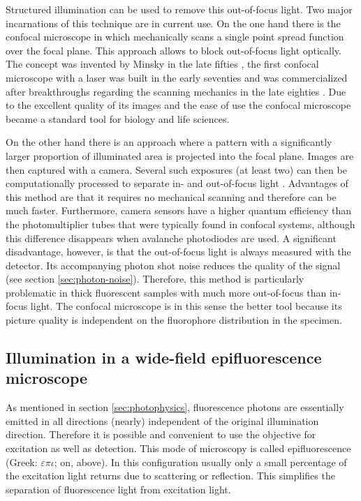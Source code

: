 Structured 
illumination can be used to remove this out-of-focus light. 
Two major incarnations of this technique are in current use.  On the one
hand there is the confocal microscope\label{sec:confocal} in which
mechanically scans a single point spread function over the focal
plane. This approach allows to block out-of-focus light optically. The
concept was invented by Minsky in the late fifties \citep{Minsky1961},
the first confocal microscope with a laser was built in the early
seventies \citep{davidovits1971scanning} and was commercialized after
breakthroughs regarding the scanning mechanics in the late eighties
\cite{Amos1987}. Due to the excellent quality of its images and the
ease of use the confocal microscope became a standard tool for biology
and life sciences.

On  the other
hand there is an approach where a pattern with a significantly larger
proportion of illuminated area is projected into the focal
plane. Images are then captured with a camera. Several such exposures
(at least two) can then be computationally processed to separate in-
and out-of-focus light \citep{Neil1997}.  Advantages of this method
are that it requires no mechanical scanning and therefore can be much
faster. Furthermore, camera sensors have a higher quantum efficiency
than the photomultiplier tubes that were typically found in confocal
systems, although this difference disappears when avalanche
photodiodes are used. A significant disadvantage, however, is that the
out-of-focus light is always measured with the detector. Its
accompanying photon shot noise reduces the quality of the signal (see
section \ref{sec:photon-noise}). Therefore, this method is particularly
problematic in thick fluorescent samples with much more out-of-focus
than in-focus light. The confocal microscope is in this sense the
better tool because its picture quality is independent on the
fluorophore distribution in the specimen. 



\subsection{Illumination in a wide-field epifluorescence microscope}
As mentioned in section \ref{sec:photophysics}, fluorescence photons
are essentially emitted in all directions (nearly) independent of the
original illumination direction. Therefore it is possible and
convenient to use the objective for excitation as well as
detection. This mode of microscopy is called epifluorescence (Greek:
$\varepsilon\pi\iota$; on, above).  In this configuration usually only
a small percentage of the excitation light returns due to scattering
or reflection. This simplifies the separation of fluorescence light
from excitation light.

